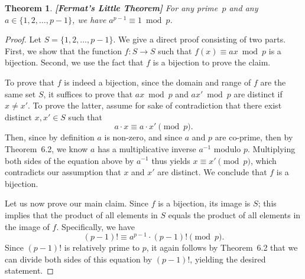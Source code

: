 \documentclass[11pt]{article}
\newcounter{thm}
\newtheorem{theorem}{Theorem}[thm]
\begin{document}
\begin{theorem}\label{fermat} {\bf [Fermat's Little Theorem]} For any prime~$p$
and any $a\in\{1,2,\ldots,p-1\}$, we have $a^{p-1}\equiv1\bmod p$.
\end{theorem}
\begin{proof}
Let $S = \{1,2,\ldots, p-1\}$. We give a direct proof consisting of two parts. First, we show that the function $f: S\rightarrow S$ such that $f(x) \equiv ax\bmod p$ is a bijection. Second, we use the fact that $f$ is a bijection to prove the claim.

\noindent

To prove that $f$ is indeed a bijection, since the domain and range of $f$ are the same set $S$, it suffices to prove that $ax\bmod p$ and $ax'\bmod p$ are distinct if $x\neq x'$. To prove the latter, assume for sake of contradiction that there exist distinct $x,x'\in S$ such that
\[
	a \cdot x \equiv a \cdot x' \pmod p.
\]
Then, since by definition $a$ is non-zero, and since $a$ and $p$ are co-prime, then by Theorem~6.2,
 we know $a$ has a multiplicative inverse $a^{-1}$ modulo $p$. Multiplying both sides of the equation above by $a^{-1}$ thus yields $x \equiv x' \pmod p$, which contradicts our assumption that $x$ and $x'$ are distinct. We conclude that $f$ is a bijection.

Let us now prove our main claim. Since $f$ is a bijection, its image is $S$; this implies that
the product of all elements in $S$ equals the product of all elements in the image of $f$. Specifically, we have
\[
	(p-1)! \equiv a^{p-1} \cdot (p-1)! \pmod p.
\]
Since $(p-1)!$ is relatively prime to $p$, it again follows by Theorem~6.2
that we can divide both sides of this equation by $(p-1)!$, yielding the desired statement.
\end{proof}
\end{document}
